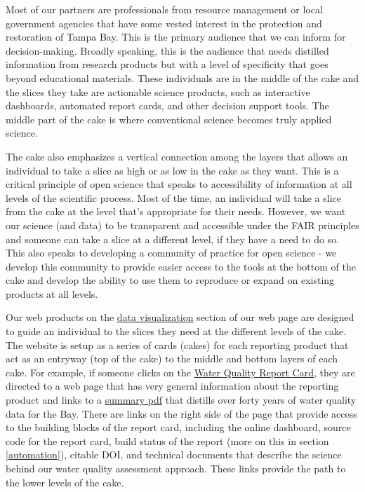 \documentclass[
]{book}
\begin{document}
Most of our partners are professionals from resource management or local government agencies that have some vested interest in the protection and restoration of Tampa Bay. This is the primary audience that we can inform for decision-making. Broadly speaking, this is the audience that needs distilled information from research products but with a level of specificity that goes beyond educational materials. These individuals are in the middle of the cake and the slices they take are actionable science products, such as interactive dashboards, automated report cards, and other decision support tools. The middle part of the cake is where conventional science becomes truly applied science.

The cake also emphasizes a vertical connection among the layers that allows an individual to take a slice as high or as low in the cake as they want. This is a critical principle of open science that speaks to accessibility of information at all levels of the scientific process. Most of the time, an individual will take a slice from the cake at the level that's appropriate for their needs. However, we want our science (and data) to be transparent and accessible under the FAIR principles and someone can take a slice at a different level, if they have a need to do so. This also speaks to developing a community of practice for open science - we develop this community to provide easier access to the tools at the bottom of the cake and develop the ability to use them to reproduce or expand on existing products at all levels.

Our web products on the \href{https://tbep.org/our-work/data-vizualization/}{data visualization} section of our web page are designed to guide an individual to the slices they need at the different levels of the cake. The website is setup as a series of cards (cakes) for each reporting product that act as an entryway (top of the cake) to the middle and bottom layers of each cake. For example, if someone clicks on the \href{https://tbep.org/water-quality-report-card/}{Water Quality Report Card}, they are directed to a web page that has very general information about the reporting product and links to a \href{https://drive.google.com/file/d/124FXmLcXKYUf3ktaVOvFejndiPS0m7K7/view?usp=sharing}{summary pdf} that distills over forty years of water quality data for the Bay. There are links on the right side of the page that provide access to the building blocks of the report card, including the online dashboard, source code for the report card, build status of the report (more on this in section \ref{automation}), citable DOI, and technical documents that describe the science behind our water quality assessment approach. These links provide the path to the lower levels of the cake.
\end{document}
